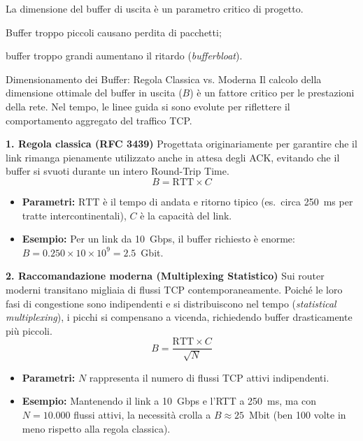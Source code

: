 \documentclass[a4paper,12pt]{report}
\begin{document}
La dimensione del buffer di uscita è un parametro critico di progetto.

Buffer troppo piccoli causano perdita di pacchetti;

buffer troppo grandi
aumentano il ritardo (\textit{bufferbloat}).

\begin{defbox}{Dimensionamento dei Buffer: Regola Classica vs. Moderna}
Il calcolo della dimensione ottimale del buffer in uscita ($B$) è un fattore critico per le prestazioni della rete. Nel tempo, le linee guida si sono evolute per riflettere il comportamento aggregato del traffico TCP.

\textbf{1. Regola classica (RFC 3439)}
Progettata originariamente per garantire che il link rimanga pienamente utilizzato anche in attesa degli ACK, evitando che il buffer si svuoti durante un intero Round-Trip Time.
\[
    B = \text{RTT} \times C
\]
\begin{itemize}
    \item \textbf{Parametri:} $\text{RTT}$ è il tempo di andata e ritorno tipico (es.\ circa 250~ms per tratte intercontinentali), $C$ è la capacità del link.
    \item \textbf{Esempio:} Per un link da 10~Gbps, il buffer richiesto è enorme: $B = 0.250 \times 10 \times 10^9 = 2.5$~Gbit.
\end{itemize}

\vspace{0.1cm}
\textbf{2. Raccomandazione moderna (Multiplexing Statistico)}
Sui router moderni transitano migliaia di flussi TCP contemporaneamente. Poiché le loro fasi di congestione sono indipendenti e si distribuiscono nel tempo (\textit{statistical multiplexing}), i picchi si compensano a vicenda, richiedendo buffer drasticamente più piccoli.
\[
    B = \frac{\text{RTT} \times C}{\sqrt{N}}
\]
\begin{itemize}
    \item \textbf{Parametri:} $N$ rappresenta il numero di flussi TCP attivi indipendenti.
    \item \textbf{Esempio:} Mantenendo il link a 10~Gbps e l'RTT a 250~ms, ma con $N = 10.000$ flussi attivi, la necessità crolla a $B \approx 25$~Mbit (ben 100 volte in meno rispetto alla regola classica).
\end{itemize}
\end{defbox}
\end{document}
